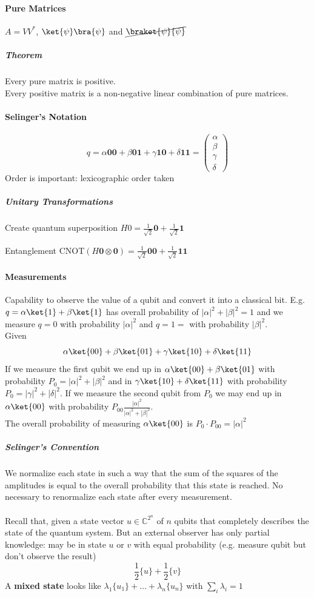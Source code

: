 \documentclass[10pt]{report}
\begin{document}
\paragraph{Pure Matrices} $A = VV^*$, $\ket{\psi}\bra{\psi}$ and $\cancel{\braket{\psi}{\psi}}$
\subparagraph{Theorem} Every pure matrix is positive.\\
Every positive matrix is a non-negative linear combination of pure matrices.
\paragraph{Selinger's Notation}
$$q = \alpha\mathbf{00} + \beta\mathbf{01} + \gamma\mathbf{10} + \delta\mathbf{11} = \left(\begin{array}{c}
\alpha\\\beta\\\gamma\\\delta
\end{array}\right)$$
Order is important: lexicographic order taken
\subparagraph{Unitary Transformations}
\begin{list}{}{}
	\item Create quantum superposition $H0 = \frac{1}{\sqrt{2}}\mathbf{0} + \frac{1}{\sqrt{2}}\mathbf{1}$
	\item Entanglement CNOT$(H\mathbf{0}\otimes\mathbf{0})=\frac{1}{\sqrt{2}}\mathbf{00}+\frac{1}{\sqrt{2}}\mathbf{11}$
\end{list}
\paragraph{Measurements} Capability to observe the value of a qubit and convert it into a classical bit. E.g. $q = \alpha\ket{1}+\beta\ket{1}$ has overall probability of $|\alpha|^2+|\beta|^2=1$ and we measure $q=0$ with probability $|\alpha|^2$ and $q=1=$ with probability $|\beta|^2$.\\
Given 
$$\alpha\ket{00}+\beta\ket{01}+\gamma\ket{10}+\delta\ket{11}$$
If we measure the first qubit we end up in $\alpha\ket{00}+\beta\ket{01}$ with probability $P_0=|\alpha|^2+|\beta|^2$ and in $\gamma\ket{10}+\delta\ket{11}$ with probability $P_0=|\gamma|^2+|\delta|^2$. If we measure the second qubit from $P_0$ we may end up in $\alpha\ket{00}$ with probability $P_{00}\frac{|\alpha|^2}{|\alpha|^2+|\beta|^2}$.\\
The overall probability of measuring $\alpha\ket{00}$ is $P_{0}\cdot P_{00} = |\alpha|^2$
\subparagraph{Selinger's Convention} We normalize each state in such a way that the sum of the squares of the amplitudes is equal to the overall probability that this state is reached. No necessary to renormalize each state after every measurement.\\\\
Recall that, given a state vector $u\in \mathbb{C}^{2^n}$ of $n$ qubits that completely describes the state of the quantum system. But an external observer has only partial knowledge: may be in state $u$ or $v$ with equal probability (e.g. measure qubit but don't observe the result)
$$\frac{1}{2}\{u\}+\frac{1}{2}\{v\}$$
A \textbf{mixed state} looks like $\lambda_1\{u_1\}+\ldots+\lambda_n\{u_n\}$ with $\sum_i \lambda_i = 1$
\end{document}
